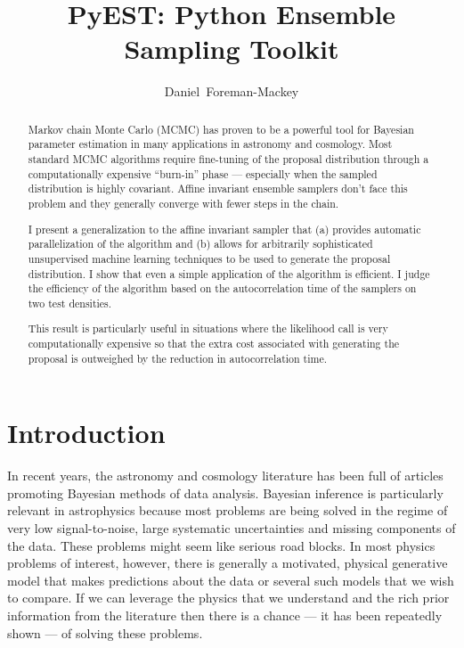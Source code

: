 \documentclass[12pt,preprint]{aastex}
\begin{document}
\title{PyEST: Python Ensemble Sampling Toolkit}
\author{Daniel~Foreman-Mackey}

\begin{abstract}

    Markov chain Monte Carlo (MCMC) has proven to be a powerful tool for Bayesian
    parameter estimation in many applications in astronomy and cosmology.  Most
    standard MCMC algorithms require fine-tuning of the proposal distribution
    through a computationally expensive ``burn-in'' phase --- especially when the
    sampled distribution is highly covariant.
    Affine invariant ensemble samplers don't face this problem and they generally
    converge with fewer steps in the chain.

    I present a generalization to the \citet{Goodman:2010} affine invariant sampler
    that (a) provides automatic parallelization of the algorithm and (b) allows
    for arbitrarily sophisticated unsupervised machine learning techniques
    to be used to generate the proposal distribution.  I show that even a simple
    application of the algorithm is efficient.  I judge the efficiency
    of the algorithm based on the autocorrelation time of the samplers on two
    test densities.

    This result is particularly useful in situations where the likelihood call is
    very computationally expensive so that the extra cost associated with generating
    the proposal is outweighed by the reduction in autocorrelation time.

\end{abstract}


\section{Introduction}

In recent years, the astronomy and cosmology literature has been full of articles
promoting Bayesian methods of data analysis. Bayesian inference is particularly
relevant in astrophysics because most problems are being solved in the regime of
very low signal-to-noise, large systematic uncertainties and missing components of
the data. These problems might seem like serious road blocks. In most physics problems
of interest, however, there is generally a motivated, physical generative model
that makes predictions about the data or several such models that we wish to compare.
If we can leverage the physics that we understand and the rich prior information
from the literature then there is a chance --- it has been repeatedly shown ---
of solving these problems.
\end{document}
